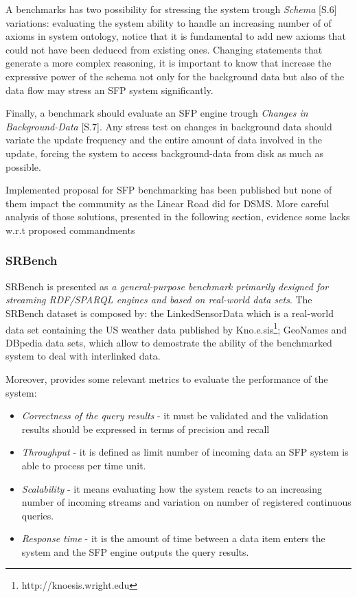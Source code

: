 A benchmarks has two possibility for stressing the system trough \textit{Schema} [S.6] variations: evaluating the system ability to handle an increasing number of of axioms in system ontology, notice that it is fundamental to add new axioms that could not have been deduced from existing ones. Changing statements that generate a more complex reasoning, it is important to know that increase the expressive power of the schema not only for the background data but also of the data flow may stress an SFP system significantly.

Finally, a benchmark should evaluate an SFP engine trough \textit{Changes in Background-Data} [S.7]. Any stress test on changes in background data should variate the update frequency and the entire amount of data involved in the update, forcing the system to access background-data from disk as much as possible.

Implemented proposal for SFP benchmarking has been published but none of them impact the community as the Linear Road did for DSMS. More careful analysis of those solutions, presented in the following section, evidence some lacks w.r.t proposed commandments \cite{DBLP:conf/esws/ScharrenbachUMVB13} 

\subsubsection{SRBench}\label{sec:srbench}

SRBench is presented as \textit{a general-purpose benchmark primarily designed for streaming RDF/SPARQL engines and based on real-world data sets}\cite{Zhang2012}. The SRBench dataset is composed by: the LinkedSensorData  which  is a real-world data set containing the US weather data published by Kno.e.sis\footnote{ http://knoesis.wright.edu};  GeoNames and DBpedia data sets, which allow to demostrate the ability of the benchmarked system to deal with interlinked data.

Moreover, \cite{Zhang2012} provides some relevant metrics to evaluate the performance of the system: \begin{itemize}
\item \textit{Correctness of the query results} - it must be validated and the validation results should be expressed in terms of precision and recall
\item \textit{Throughput} - it is defined as limit number of incoming data  an SFP system is able to process per time unit.
\item \textit{Scalability} - it means evaluating how the system reacts to an increasing number of incoming streams and variation on number of registered continuous queries.
\item \textit{Response time} - it is the amount of time between a data item enters the system and the SFP engine outputs the query results.
\end{itemize}

